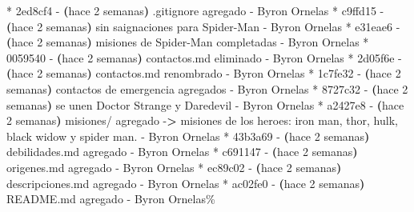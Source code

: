 \documentclass[
]{book}
\newenvironment{Shaded}{\begin{snugshade}}{\end{snugshade}}
\newcommand{\AttributeTok}[1]{\textcolor[rgb]{0.13,0.29,0.53}{#1}}
\newcommand{\ErrorTok}[1]{\textcolor[rgb]{0.64,0.00,0.00}{\textbf{#1}}}
\newcommand{\ExtensionTok}[1]{#1}
\newcommand{\KeywordTok}[1]{\textcolor[rgb]{0.13,0.29,0.53}{\textbf{#1}}}
\newcommand{\NormalTok}[1]{#1}
\newcommand{\OperatorTok}[1]{\textcolor[rgb]{0.81,0.36,0.00}{\textbf{#1}}}
\begin{document}
\begin{Shaded}
\begin{Highlighting}[]
\ExtensionTok{*}\NormalTok{ 2ed8cf4 }\AttributeTok{{-}} \ErrorTok{(}\ExtensionTok{hace}\NormalTok{ 2 semanas}\KeywordTok{)} \ExtensionTok{.gitignore}\NormalTok{ agregado }\AttributeTok{{-}}\NormalTok{ Byron Ornelas}
\ExtensionTok{*}\NormalTok{ c9ffd15 }\AttributeTok{{-}} \ErrorTok{(}\ExtensionTok{hace}\NormalTok{ 2 semanas}\KeywordTok{)} \ExtensionTok{sin}\NormalTok{ saignaciones para Spider{-}Man }\AttributeTok{{-}}\NormalTok{ Byron Ornelas}
\ExtensionTok{*}\NormalTok{ e31eae6 }\AttributeTok{{-}} \ErrorTok{(}\ExtensionTok{hace}\NormalTok{ 2 semanas}\KeywordTok{)} \ExtensionTok{misiones}\NormalTok{ de Spider{-}Man completadas }\AttributeTok{{-}}\NormalTok{ Byron Ornelas}
\ExtensionTok{*}\NormalTok{ 0059540 }\AttributeTok{{-}} \ErrorTok{(}\ExtensionTok{hace}\NormalTok{ 2 semanas}\KeywordTok{)} \ExtensionTok{contactos.md}\NormalTok{ eliminado }\AttributeTok{{-}}\NormalTok{ Byron Ornelas}
\ExtensionTok{*}\NormalTok{ 2d05f6e }\AttributeTok{{-}} \ErrorTok{(}\ExtensionTok{hace}\NormalTok{ 2 semanas}\KeywordTok{)} \ExtensionTok{contactos.md}\NormalTok{ renombrado }\AttributeTok{{-}}\NormalTok{ Byron Ornelas}
\ExtensionTok{*}\NormalTok{ 1c7fe32 }\AttributeTok{{-}} \ErrorTok{(}\ExtensionTok{hace}\NormalTok{ 2 semanas}\KeywordTok{)} \ExtensionTok{contactos}\NormalTok{ de emergencia agregados }\AttributeTok{{-}}\NormalTok{ Byron Ornelas}
\ExtensionTok{*}\NormalTok{ 8727c32 }\AttributeTok{{-}} \ErrorTok{(}\ExtensionTok{hace}\NormalTok{ 2 semanas}\KeywordTok{)} \ExtensionTok{se}\NormalTok{ unen Doctor Strange y Daredevil }\AttributeTok{{-}}\NormalTok{ Byron Ornelas}
\ExtensionTok{*}\NormalTok{ a2427e8 }\AttributeTok{{-}} \ErrorTok{(}\ExtensionTok{hace}\NormalTok{ 2 semanas}\KeywordTok{)} \ExtensionTok{misiones/}\NormalTok{ agregado }\AttributeTok{{-}}\OperatorTok{\textgreater{}}\NormalTok{ misiones de los heroes: iron man, thor, hulk, black widow y spider man. }\AttributeTok{{-}}\NormalTok{ Byron Ornelas}
\ExtensionTok{*}\NormalTok{ 43b3a69 }\AttributeTok{{-}} \ErrorTok{(}\ExtensionTok{hace}\NormalTok{ 2 semanas}\KeywordTok{)} \ExtensionTok{debilidades.md}\NormalTok{ agregado }\AttributeTok{{-}}\NormalTok{ Byron Ornelas}
\ExtensionTok{*}\NormalTok{ c691147 }\AttributeTok{{-}} \ErrorTok{(}\ExtensionTok{hace}\NormalTok{ 2 semanas}\KeywordTok{)} \ExtensionTok{origenes.md}\NormalTok{ agregado }\AttributeTok{{-}}\NormalTok{ Byron Ornelas}
\ExtensionTok{*}\NormalTok{ ec89c02 }\AttributeTok{{-}} \ErrorTok{(}\ExtensionTok{hace}\NormalTok{ 2 semanas}\KeywordTok{)} \ExtensionTok{descripciones.md}\NormalTok{ agregado }\AttributeTok{{-}}\NormalTok{ Byron Ornelas}
\ExtensionTok{*}\NormalTok{ ac02fe0 }\AttributeTok{{-}} \ErrorTok{(}\ExtensionTok{hace}\NormalTok{ 2 semanas}\KeywordTok{)} \ExtensionTok{README.md}\NormalTok{ agregado }\AttributeTok{{-}}\NormalTok{ Byron Ornelas\%  }
\end{Highlighting}
\end{Shaded}
\end{document}
